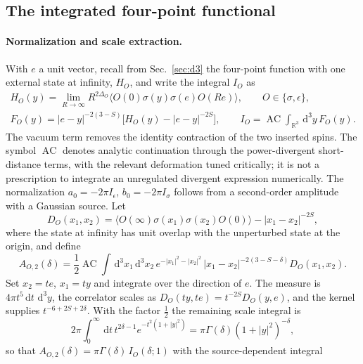 \documentclass[11pt,a4paper]{article}
\numberwithin{equation}{section}
\newcommand{\dd}{\,\mathrm d}
\newcommand{\AC}{\operatorname{AC}}
\begin{document}
\subsection{The integrated four-point functional}\label{app:cone:functional}
\paragraph{Normalization and scale extraction.} With $e$ a unit vector, recall from Sec.~\ref{sec:d3} the
four-point function with one external state at infinity, $H_O$, and write the integral $I_O$ as
\begin{equation}
\begin{gathered}
 H_O(y)=\lim_{R\to\infty}R^{2\Delta_O}\langle O(0)\sigma(y)\sigma(e)O(Re)\rangle,\qquad O\in\{\sigma,\epsilon\},\\
 F_O(y)=|e-y|^{-2(3-S)}\bigl[H_O(y)-|e-y|^{-2S}\bigr],\qquad I_O=\AC\!\int_{\mathbb R^3}\dd^3y\,F_O(y).
\end{gathered}
 \label{eq:cone:FO}
\end{equation}
The vacuum term removes the identity contraction of the two inserted spins. The symbol $\AC$ denotes analytic
continuation through the power-divergent short-distance terms, with the relevant deformation tuned critically; it is not
a prescription to integrate an unregulated divergent expression numerically. The normalization
$a_0=-2\pi I_\epsilon$, $b_0=-2\pi I_\sigma$ follows from a second-order amplitude with a Gaussian source. Let
\begin{equation}
 D_O(x_1,x_2)=\langle O(\infty)\sigma(x_1)\sigma(x_2)O(0)\rangle-|x_1-x_2|^{-2S},
\end{equation}
where the state at infinity has unit overlap with the unperturbed state at the origin, and define
\begin{equation}
 A_{O,2}(\delta)=\frac12\AC\!\int\dd^3x_1\dd^3x_2\,e^{-|x_1|^2-|x_2|^2}\,|x_1-x_2|^{-2(3-S-\delta)}D_O(x_1,x_2).
 \label{eq:cone:A2}
\end{equation}
Set $x_2=te$, $x_1=ty$ and integrate over the direction of $e$. The measure is $4\pi t^5\dd t\,\dd^3y$, the correlator
scales as $D_O(ty,te)=t^{-2S}D_O(y,e)$, and the kernel supplies $t^{-6+2S+2\delta}$. With the factor $\frac12$ the
remaining scale integral is
\begin{equation}
 2\pi\int_0^\infty\dd t\,t^{2\delta-1}e^{-t^2(1+|y|^2)}=\pi\Gamma(\delta)(1+|y|^2)^{-\delta},
\end{equation}
so that $A_{O,2}(\delta)=\pi\Gamma(\delta)\,I_O(\delta;1)$ with the source-dependent integral
\end{document}
